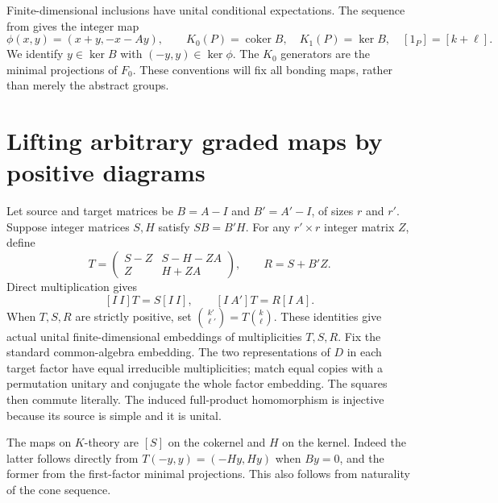 \documentclass[11pt,letterpaper]{amsart}
\theoremstyle{remark}\newtheorem{remark}[theorem]{Remark}
\newcommand{\Z}{\mathbb Z}\newcommand{\C}{\mathbb C}
\newcommand{\coker}{\operatorname{coker}}\newcommand{\rank}{\operatorname{rank}}
\begin{document}
Finite-dimensional inclusions have unital conditional expectations.
The sequence from \cite[Theorem 4.1]{FG} gives the integer map
\[
 \phi(x,y)=(x+y,-x-Ay),\qquad
 K_0(P)=\coker B,\quad K_1(P)=\ker B,\quad [1_P]=[k+\ell].
\]
We identify $y\in\ker B$ with $(-y,y)\in\ker\phi$. The $K_0$ generators
are the minimal projections of $F_0$. These conventions will fix all
bonding maps, rather than merely the abstract groups.

\section{Lifting arbitrary graded maps by positive diagrams}
Let source and target matrices be $B=A-I$ and $B'=A'-I$, of sizes
$r$ and $r'$. Suppose integer matrices $S,H$ satisfy $SB=B'H$.
For any $r'\times r$ integer matrix $Z$, define
\begin{equation}\label{eq:T}
 T=\begin{pmatrix}S-Z&S-H-ZA\\Z&H+ZA\end{pmatrix},
 \qquad R=S+B'Z.
\end{equation}
Direct multiplication gives
\begin{equation}\label{eq:squares}
 [I\ I]T=S[I\ I],\qquad [I\ A']T=R[I\ A].
\end{equation}
When $T,S,R$ are strictly positive, set
$\binom{k'}{\ell'}=T\binom{k}{\ell}$. These identities give actual
unital finite-dimensional embeddings of multiplicities $T,S,R$.
Fix the standard common-algebra embedding. The two representations of
$D$ in each target factor have equal irreducible multiplicities; match
equal copies with a permutation unitary and conjugate the whole factor
embedding. The squares then commute literally. The induced full-product
homomorphism is injective because its source is simple and it is unital.

The maps on $K$-theory are $[S]$ on the cokernel and $H$ on the kernel.
Indeed the latter follows directly from
$T(-y,y)=(-Hy,Hy)$ when $By=0$, and the former from the first-factor
minimal projections. This also follows from naturality of the cone sequence.
\end{document}
